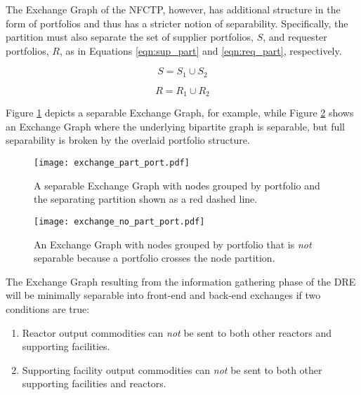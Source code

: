 The Exchange Graph of the NFCTP, however, has additional structure in the form
of portfolios and thus has a stricter notion of separability. Specifically, the
partition must also separate the set of supplier portfolios, $S$, and requester
portfolios, $R$, as in Equations \ref{eqn:sup_part} and \ref{eqn:req_part},
respectively.

\begin{equation}\label{eqn:sup_part}
  S = S_{1} \cup S_{2}
\end{equation}

\begin{equation}\label{eqn:req_part}
  R = R_{1} \cup R_{2}
\end{equation}

Figure \ref{fig:port_part} depicts a separable Exchange Graph, for example,
while Figure \ref{fig:port_no_part} shows an Exchange Graph where the underlying
bipartite graph is separable, but full separability is broken by the overlaid
portfolio structure.

\begin{figure}
  \begin{center}
    \texttt{[image: exchange\_part\_port.pdf]}
    \caption{
      \label{fig:port_part}
      A separable Exchange Graph with nodes grouped by portfolio and the
      separating partition shown as a red dashed line.}
  \end{center}
\end{figure}

\begin{figure}
  \begin{center}
    \texttt{[image: exchange\_no\_part\_port.pdf]}
    \caption{
      \label{fig:port_no_part}
      An Exchange Graph with nodes grouped by portfolio that is \textit{not}
      separable because a portfolio crosses the node partition.}
  \end{center}
\end{figure}

The Exchange Graph resulting from the information gathering phase of the DRE
will be minimally separable into front-end and back-end exchanges if two
conditions are true:

\begin{enumerate}
  \item Reactor output commodities can \textit{not} be sent to both other
    reactors and supporting facilities.

  \item Supporting facility output commodities can \textit{not} be sent to both
    other supporting facilities and reactors.
\end{enumerate}

